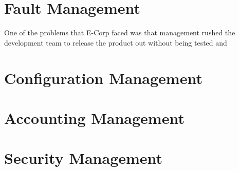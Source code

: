 \documentclass[]{report}
\begin{document}
\section*{Fault Management}
One of the problems that E-Corp faced was that management rushed the development team to release the product out without being tested and  

\section*{Configuration Management}

\section*{Accounting Management}

\section*{Security Management}
\end{document}
